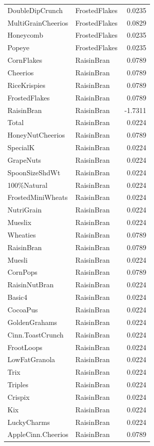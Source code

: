 \begin{longtable}{llr}
DoubleDipCrunch & FrostedFlakes & 0.0235 \\
MultiGrainCheerios & FrostedFlakes & 0.0829 \\
Honeycomb & FrostedFlakes & 0.0235 \\
Popeye & FrostedFlakes & 0.0235 \\
CornFlakes & RaisinBran & 0.0789 \\
Cheerios & RaisinBran & 0.0789 \\
RiceKrispies & RaisinBran & 0.0789 \\
FrostedFlakes & RaisinBran & 0.0789 \\
RaisinBran & RaisinBran & -1.7311 \\
Total & RaisinBran & 0.0224 \\
HoneyNutCheerios & RaisinBran & 0.0789 \\
SpecialK & RaisinBran & 0.0224 \\
GrapeNuts & RaisinBran & 0.0224 \\
SpoonSizeShdWt & RaisinBran & 0.0224 \\
100\%Natural & RaisinBran & 0.0224 \\
FrostedMiniWheats & RaisinBran & 0.0224 \\
NutriGrain & RaisinBran & 0.0224 \\
Mueslix & RaisinBran & 0.0224 \\
Wheaties & RaisinBran & 0.0789 \\
RaisinBran & RaisinBran & 0.0789 \\
Muesli & RaisinBran & 0.0224 \\
CornPops & RaisinBran & 0.0789 \\
RaisinNutBran & RaisinBran & 0.0224 \\
Basic4 & RaisinBran & 0.0224 \\
CocoaPus & RaisinBran & 0.0224 \\
GoldenGrahams & RaisinBran & 0.0224 \\
Cinn.ToastCrunch & RaisinBran & 0.0224 \\
FrootLoops & RaisinBran & 0.0224 \\
LowFatGranola & RaisinBran & 0.0224 \\
Trix & RaisinBran & 0.0224 \\
Triples & RaisinBran & 0.0224 \\
Crispix & RaisinBran & 0.0224 \\
Kix & RaisinBran & 0.0224 \\
LuckyCharms & RaisinBran & 0.0224 \\
AppleCinn.Cheerios & RaisinBran & 0.0789 \\

\end{longtable}
